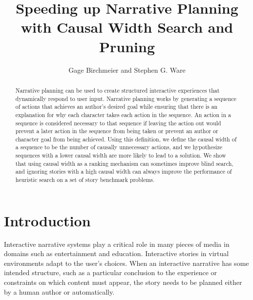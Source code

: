 \documentclass[letterpaper]{article} %
\title{Speeding up Narrative Planning with Causal Width Search and Pruning}
\author{
    Gage Birchmeier and Stephen G. Ware
}
\begin{document}
\maketitle


\begin{abstract}
Narrative planning can be used to create structured interactive experiences that dynamically respond to user input. Narrative planning works by generating a sequence of actions that achieves an author's desired goal while ensuring that there is an explanation for why each character takes each action in the sequence. An action in a sequence is considered necessary to that sequence if leaving the action out would prevent a later action in the sequence from being taken or prevent an author or character goal from being achieved. Using this definition, we define the causal width of a sequence to be the number of causally unnecessary actions, and we hypothesize sequences with a lower causal width are more likely to lead to a solution. We show that using causal width as a ranking mechanism can sometimes improve blind search, and ignoring stories with a high causal width can always improve the performance of heuristic search on a set of story benchmark problems.
\end{abstract}



\section{Introduction}

Interactive narrative systems play a critical role in many pieces of media in domains such as entertainment and education. Interactive stories in virtual environments adapt to the user's choices. When an interactive narrative has some intended structure, such as a particular conclusion to the experience or constraints on which content must appear, the story needs to be planned either by a human author or automatically.
\end{document}
